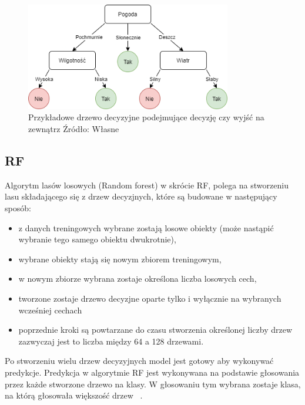 \begin{figure}[h]
    \centering
    \includegraphics[width=0.8\textwidth]{./Img/BinaryTree.png}
    \caption{Przykładowe drzewo decyzyjne podejmujące decyzję czy wyjść na zewnątrz Źródło: Własne}
\end{figure}

\subsection{RF}
Algorytm lasów losowych (Random forest) w skrócie RF, polega na stworzeniu lasu składającego się z drzew decyzjnych, 
które są budowane w następujący sposób:
\begin{itemize}
    \item z danych treningowych wybrane zostają losowe obiekty (może nastąpić wybranie tego samego obiektu dwukrotnie),
    \item wybrane obiekty stają się nowym zbiorem treningowym,
    \item w nowym zbiorze wybrana zostaje określona liczba losowych cech,
    \item tworzone zostaje drzewo decyzjne oparte tylko i wyłącznie na wybranych wcześniej cechach
    \item poprzednie kroki są powtarzane do czasu stworzenia określonej liczby drzew zazwyczaj jest to 
    liczba między 64 a 128 drzewami. 
\end{itemize}
Po stworzeniu wielu drzew decyzyjnych model jest gotowy aby wykonywać predykcje.
Predykcja w algorytmie RF jest wykonywana na podstawie głosowania przez każde stworzone drzewo na klasy. W głosowaniu 
tym wybrana zostaje klasa, na którą głosowała większość drzew ~\cite{randomforest}.

